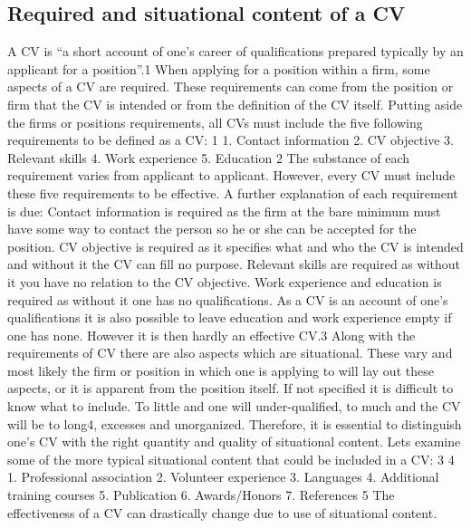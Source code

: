 \subsection{Required and situational content of a CV}
A CV is “a short account of one’s career of qualifications prepared typically by an applicant for a position”.1
When applying for a position within a firm, some aspects of a CV are required.
These requirements can come from the position or firm that the CV is intended or from the definition of the CV itself.
Putting aside the firms or positions requirements, all CVs must include the five following requirements to be defined as a CV:
1%
1. Contact information
2. CV objective
3. Relevant skills
4. Work experience
5. Education
2%
The substance of each requirement varies from applicant to applicant. However, every CV must include these five requirements to be effective.
A further explanation of each requirement is due:
Contact information is required as the firm at the bare minimum must have some way to contact the person so he or she can be accepted for the position.
CV objective is required as it specifies what and who the CV is intended and without it the CV can fill no purpose.
Relevant skills are required as without it you have no relation to the CV objective.
Work experience and education is required as without it one has no qualifications.
As a CV is an account of one’s qualifications it is also possible to leave education and work experience empty if one has none.
However it is then hardly an effective CV.3
Along with the requirements of CV there are also aspects which are situational.
These vary and most likely the firm or position in which one is applying to will lay out these aspects, or it is apparent from the position itself.
If not specified it is difficult to know what to include. To little and one will under-qualified, to much and the CV will be to long4, excesses and unorganized.
Therefore, it is essential to distinguish one’s CV with the right quantity and quality of situational content.
Lets examine some of the more typical situational content that could be included in a CV:
3%
4%
1. Professional association
2. Volunteer experience
3. Languages
4. Additional training courses
5. Publication
6. Awards/Honors
7. References
5%
The effectiveness of a CV can drastically change due to use of situational content.
